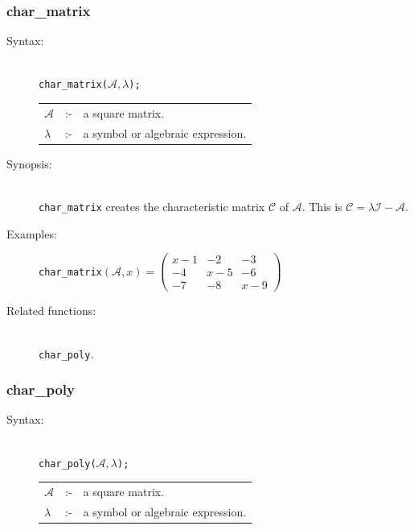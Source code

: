 {\subsubsection{char\_matrix}
\label{linalg:char_matrix}
\hypertarget{operator:CHAR_MATRIX}{}

\begin{description}
\item[Syntax:]\mbox{}\\
{\tt char\_matrix($\mathcal{A},\lambda$);}\\[2mm]
\begin{tabular}{l l l}
$\mathcal{A}$ &:-& a square matrix. \\
$\lambda$  &:-& a symbol or algebraic expression.
\end{tabular}

\item[Synopsis:]\mbox{}\\
\texttt{char\_matrix} creates the characteristic matrix $\mathcal{C}$ of
$\mathcal{A}$.  This is $\mathcal{C} = \lambda \mathcal{I} - \mathcal{A}$.

\item[Examples:]
\begin{flushleft}
\texttt{char\_matrix}\((\mathcal{A},x) =
\begin{pmatrix} x-1 & -2 & -3 \\ -4 & x-5 & -6 \\ -7 & -8 & x-9 \end{pmatrix}\)
\end{flushleft}

\item[Related functions:]\mbox{}\\
\texttt{char\_poly}.
\end{description}


\subsubsection{char\_poly}
\label{linalg:char_poly}
\hypertarget{operator:CHAR_POLY}{}

\begin{description}
\item[Syntax:]\mbox{}\\
{\tt char\_poly($\mathcal{A},\lambda$);}\\[2mm]
\begin{tabular}{l l l}
$\mathcal{A}$ &:-& a square matrix. \\
$\lambda$ &:-& a symbol or algebraic expression.
\end{tabular}


\end{description}}
